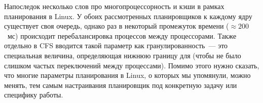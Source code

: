 Напоследок несколько слов про многопроцессорность и кэши в рамках планирования в
Linux. У обоих рассмотренных планировщиков к каждому ядру существует своя
очередь, однако раз в некоторый промежуток времени (\(\approx 200\)~мс)
происходит перебалансировка процессов между процессорами. Также отдельно в CFS
вводится такой параметр как гранулированность~--- это специальная величина,
определяющая нижнюю границу для \maxexectime{} (чтобы не было слишком частых
переключений между процессами). Помимо этого нужно сказать, что многие
параметры планирования в Linux, о которых мы упомянули, можно менять, тем самым
настраивания планировщик под конкретную задачу или специфику работы.
